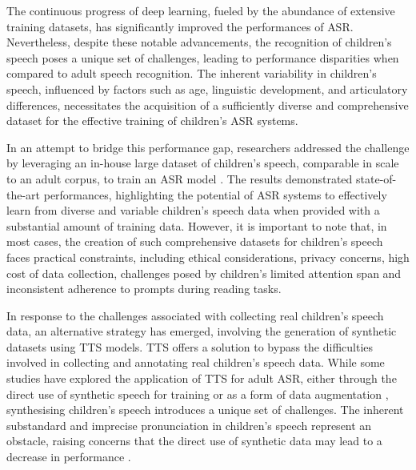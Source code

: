 \label{chap:6}
\cleardoublepage


The continuous progress of deep learning, fueled by the abundance of extensive training datasets, has significantly improved the performances of \ac{ASR}. Nevertheless, despite these notable advancements, the recognition of children's speech poses a unique set of challenges, leading to performance disparities when compared to adult speech recognition. The inherent variability in children's speech, influenced by factors such as age, linguistic development, and articulatory differences, necessitates the acquisition of a sufficiently diverse and comprehensive dataset for the effective training of children's \ac{ASR} systems.


In an attempt to bridge this performance gap, researchers addressed the challenge by leveraging an in-house large dataset of children's speech, comparable in scale to an adult corpus, to train an \ac{ASR} model  \cite{asr-google}. The results demonstrated state-of-the-art performances, highlighting the potential of \ac{ASR} systems to effectively learn from diverse and variable children's speech data when provided with a substantial amount of training data. However, it is important to note that, in most cases, the creation of such comprehensive datasets for children's speech faces practical constraints, including ethical considerations, privacy concerns, high cost of data collection, challenges posed by children's limited attention span and inconsistent adherence to prompts during reading tasks.


In response to the challenges associated with collecting real children's speech data, an alternative strategy has emerged, involving the generation of synthetic datasets using \ac{TTS} models. \ac{TTS} offers a solution to bypass the difficulties involved in collecting and annotating real children's speech data. While some studies have explored the application of \ac{TTS} for adult \ac{ASR}, either through the direct use of synthetic speech for training or as a form of data augmentation \cite{laptev2020you, fazel21_interspeech}, synthesising children's speech introduces a unique set of challenges. The inherent substandard and imprecise pronunciation in children's speech \cite{wang2021towards} represent an obstacle, raising concerns that the direct use of synthetic data may lead to a decrease in performance \cite{wang2021towards, hu2022synt++}.

